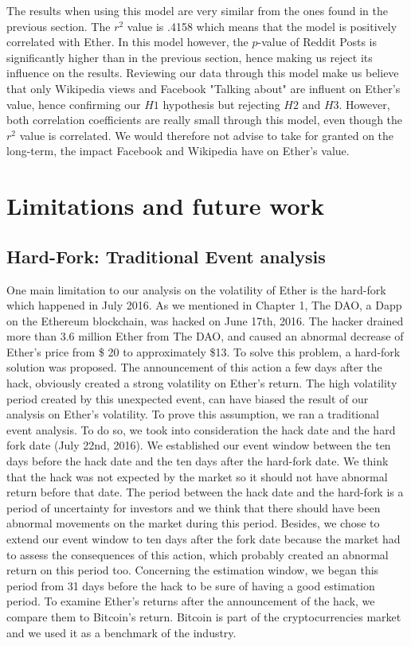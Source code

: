 \documentclass[11pt]{report}
\begin{document}
The results when using this model are very similar from the ones found in the previous section. The $r^2$ value is .4158 which means that the model is positively correlated with Ether. In this model however, the $p$-value of Reddit Posts is significantly higher than in the previous section, hence making us reject its influence on the results. \newline
Reviewing our data through this model make us believe that only Wikipedia views and Facebook "Talking about" are influent on Ether's value, hence confirming our $H1$ hypothesis but rejecting $H2$ and $H3$. However, both correlation coefficients are really small through this model, even though the $r^2$ value is correlated. We would therefore not advise to take for granted on the long-term, the impact Facebook and Wikipedia have on Ether's value.
\clearpage

\chapter{Limitations and future work}
\section{Hard-Fork: Traditional Event analysis}
One main limitation to our analysis on the volatility of Ether is the hard-fork which happened in July 2016. As we mentioned in Chapter 1, The DAO, a Dapp on the Ethereum blockchain, was hacked on  June 17th, 2016. The hacker drained more than 3.6 million Ether from The DAO, and caused an abnormal decrease of Ether’s price from \$ 20 to approximately \$13. To solve this problem, a hard-fork solution was proposed. The announcement of this action a few days after the hack, obviously created a strong volatility on Ether’s return. \newline
The high volatility period created by this unexpected event, can have biased the result of our analysis on Ether’s volatility. To prove this assumption, we ran a traditional event analysis. To do so, we took into consideration the hack date and the hard fork date (July 22nd, 2016). We established our event window between the ten days before the hack date and the ten days after the hard-fork date. We think that the hack was not expected by the market so it should not have abnormal return before that date. The period between the hack date and the hard-fork is a period of uncertainty for investors and we think that there should have been abnormal movements on the market during this period. Besides, we chose to extend our event window to ten days after the fork date because the market had to assess the consequences of this action, which probably created an abnormal return on this period too. Concerning the estimation window, we began this period from 31 days before the hack to be sure of having a good estimation period. To examine Ether’s returns after the announcement of the hack, we compare them to Bitcoin’s return. Bitcoin is part of the cryptocurrencies market and we used it as a benchmark of the industry.
\end{document}
